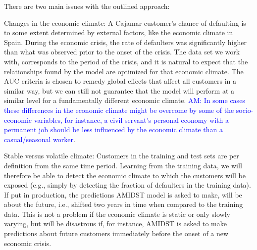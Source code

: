 \documentclass{article}
\theoremstyle{theorem}
\theoremstyle{definition}
\begin{document}
There are two main issues with the outlined approach:
\bde

\item[Changes in the economic climate:]  A Cajamar customer's chance of defaulting is to some  extent determined by external factors, like the economic climate in Spain. During the economic crisis, the rate of defaulters was significantly higher than what was observed prior to the onset of the crisis. The data set we work with, corresponds to the period of the crisis, and it is natural to expect that the relationships found by the model are optimized for that economic climate. The AUC criteria is chosen to remedy global effects that affect all customers in a similar way, but we can still not guarantee that the model will perform at a similar level for a fundamentally different economic climate. \textcolor{blue}{AM: In some cases these differences in the economic climate might be overcome by some of the socio-economic variables, for instance, a civil servant's personal economy with a permanent job should be less influenced by the economic climate than a casual/seasonal worker}.

\item[Stable versus volatile climate:] Customers in the training and test sets are per definition from the same time period. Learning from the training data, we will therefore be able to detect the economic climate to which the customers will be exposed (e.g., simply by detecting the fraction of defaulters in the training data). If put in production, the predictions AMIDST model is asked to make, will be about the future, i.e., shifted two years in time when compared to the training data. This is not a problem if the economic climate is static or only slowly varying, but will be disastrous if, for instance, AMIDST is asked to make predictions about future customers immediately before the onset of a new economic crisis.
\end{document}
